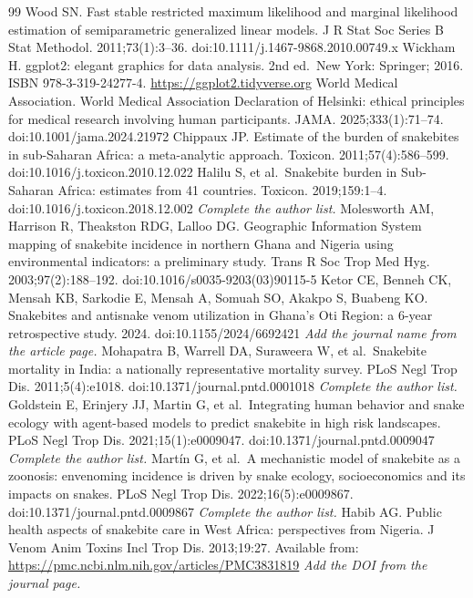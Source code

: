 \documentclass[11pt,a4paper]{article}
\begin{document}
\begin{thebibliography}{99}
 Wood SN. Fast stable restricted maximum likelihood and marginal likelihood estimation of semiparametric generalized linear models. J R Stat Soc Series B Stat Methodol. 2011;73(1):3--36. doi:10.1111/j.1467-9868.2010.00749.x
 Wickham H. ggplot2: elegant graphics for data analysis. 2nd ed.~New York: Springer; 2016. ISBN 978-3-319-24277-4. \url{https://ggplot2.tidyverse.org}
 World Medical Association. World Medical Association Declaration of Helsinki: ethical principles for medical research involving human participants. JAMA. 2025;333(1):71--74. doi:10.1001/jama.2024.21972
 Chippaux JP. Estimate of the burden of snakebites in sub-Saharan Africa: a meta-analytic approach. Toxicon. 2011;57(4):586--599. doi:10.1016/j.toxicon.2010.12.022
 Halilu S, et al.~Snakebite burden in Sub-Saharan Africa: estimates from 41 countries. Toxicon. 2019;159:1--4. doi:10.1016/j.toxicon.2018.12.002 \emph{Complete the author list.}
 Molesworth AM, Harrison R, Theakston RDG, Lalloo DG. Geographic Information System mapping of snakebite incidence in northern Ghana and Nigeria using environmental indicators: a preliminary study. Trans R Soc Trop Med Hyg. 2003;97(2):188--192. doi:10.1016/s0035-9203(03)90115-5
 Ketor CE, Benneh CK, Mensah KB, Sarkodie E, Mensah A, Somuah SO, Akakpo S, Buabeng KO. Snakebites and antisnake venom utilization in Ghana's Oti Region: a 6-year retrospective study. 2024. doi:10.1155/2024/6692421 \emph{Add the journal name from the article page.}
 Mohapatra B, Warrell DA, Suraweera W, et al.~Snakebite mortality in India: a nationally representative mortality survey. PLoS Negl Trop Dis. 2011;5(4):e1018. doi:10.1371/journal.pntd.0001018 \emph{Complete the author list.}
 Goldstein E, Erinjery JJ, Martin G, et al.~Integrating human behavior and snake ecology with agent-based models to predict snakebite in high risk landscapes. PLoS Negl Trop Dis. 2021;15(1):e0009047. doi:10.1371/journal.pntd.0009047 \emph{Complete the author list.}
 Martín G, et al.~A mechanistic model of snakebite as a zoonosis: envenoming incidence is driven by snake ecology, socioeconomics and its impacts on snakes. PLoS Negl Trop Dis. 2022;16(5):e0009867. doi:10.1371/journal.pntd.0009867 \emph{Complete the author list.}
 Habib AG. Public health aspects of snakebite care in West Africa: perspectives from Nigeria. J Venom Anim Toxins Incl Trop Dis. 2013;19:27. Available from: \url{https://pmc.ncbi.nlm.nih.gov/articles/PMC3831819} \emph{Add the DOI from the journal page.}

\end{thebibliography}
\end{document}
